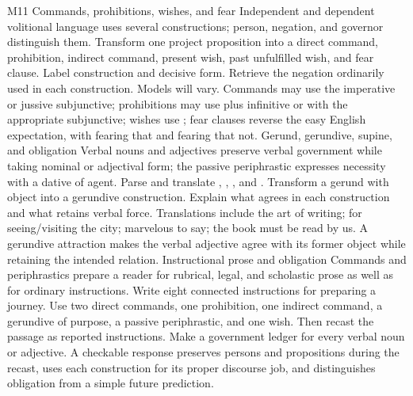 \begin{courseunit}{M11}
\SubmoduleExtension
  {Commands, prohibitions, wishes, and fear}
  {Independent and dependent volitional language uses several constructions;
  person, negation, and governor distinguish them.}
  {Transform one project proposition into a direct command, prohibition,
  indirect command, present wish, past unfulfilled wish, and fear clause.
  Label construction and decisive form.}
  {Retrieve the negation ordinarily used in each construction.}
  {Models will vary.  Commands may use the imperative or jussive subjunctive;
  prohibitions may use  plus infinitive or  with
  the appropriate subjunctive; wishes use ; fear clauses reverse
  the easy English expectation, with  fearing that and 
  fearing that not.}
\SubmoduleExtension
  {Gerund, gerundive, supine, and obligation}
  {Verbal nouns and adjectives preserve verbal government while taking nominal
  or adjectival form; the passive periphrastic expresses necessity with a
  dative of agent.}
  {Parse and translate , ,
  , and .  Transform a
  gerund with object into a gerundive construction.}
  {Explain what agrees in each construction and what retains verbal force.}
  {Translations include the art of writing; for seeing/visiting the city;
  marvelous to say; the book must be read by us.  A gerundive attraction makes
  the verbal adjective agree with its former object while retaining the
  intended relation.}
\SubmoduleExtension
  {Instructional prose and obligation}
  {Commands and periphrastics prepare a reader for rubrical, legal, and
  scholastic prose as well as for ordinary instructions.}
  {Write eight connected instructions for preparing a journey.  Use two direct
  commands, one prohibition, one indirect command, a gerundive of purpose, a
  passive periphrastic, and one wish.  Then recast the passage as reported
  instructions.}
  {Make a government ledger for every verbal noun or adjective.}
  {A checkable response preserves persons and propositions during the recast,
  uses each construction for its proper discourse job, and distinguishes
  obligation from a simple future prediction.}
\end{courseunit}

